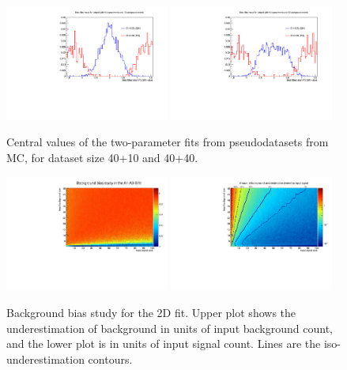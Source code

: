 \documentclass{cmspaper}
\begin{document}
\begin{figure}[htb!]
  \begin{center}
    \includegraphics[width=0.48\textwidth]{figures/A1A3BFit_Comparison_40_10.pdf}
    \includegraphics[width=0.48\textwidth]{figures/A1A3BFit_Comparison_40_40.pdf}
    \caption{Central values of the two-parameter fits from
    pseudodatasets from MC, for dataset size 40+10 and 40+40.}
    \label{fig:A1A3BFitCentralValueDistribution}
  \end{center}
\end{figure}

\begin{figure}[htb!]
  \begin{center}
    \includegraphics[width=0.48\textwidth]{figures/A1A3BFit_BackgroundBias.pdf}
    \includegraphics[width=0.48\textwidth]{figures/A1A3BFit_Underestimation.pdf}
    \caption{Background bias study for the 2D fit.  Upper plot shows the underestimation of background
    in units of input background count, and the lower plot is in units of input signal count.  Lines
    are the iso-underestimation contours.}
    \label{fig:A1A3BFitBackgroundBias}
  \end{center}
\end{figure}
\end{document}

